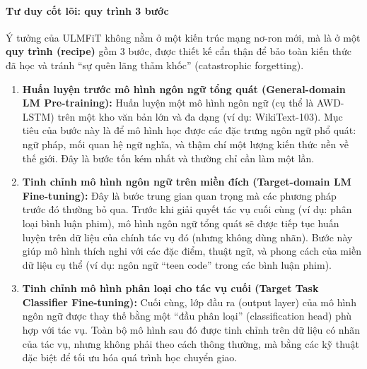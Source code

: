 \paragraph{Tư duy cốt lõi: quy trình 3 bước}
Ý tưởng của ULMFiT không nằm ở một kiến trúc mạng nơ-ron mới, mà là ở một \textbf{quy trình (recipe)} gồm 3 bước, được thiết kế cẩn thận để bảo toàn kiến thức đã học và tránh “sự quên lãng thảm khốc” (catastrophic forgetting).

\begin{enumerate}
    \item \textbf{Huấn luyện trước mô hình ngôn ngữ tổng quát (General-domain LM Pre-training):} Huấn luyện một mô hình ngôn ngữ (cụ thể là AWD-LSTM) trên một kho văn bản lớn và đa dạng (ví dụ: WikiText-103). Mục tiêu của bước này là để mô hình học được các đặc trưng ngôn ngữ phổ quát: ngữ pháp, mối quan hệ ngữ nghĩa, và thậm chí một lượng kiến thức nền về thế giới. Đây là bước tốn kém nhất và thường chỉ cần làm một lần.

    \item \textbf{Tinh chỉnh mô hình ngôn ngữ trên miền đích (Target-domain LM Fine-tuning):} Đây là bước trung gian quan trọng mà các phương pháp trước đó thường bỏ qua. Trước khi giải quyết tác vụ cuối cùng (ví dụ: phân loại bình luận phim), mô hình ngôn ngữ tổng quát sẽ được tiếp tục huấn luyện trên dữ liệu của chính tác vụ đó (nhưng không dùng nhãn). Bước này giúp mô hình thích nghi với các đặc điểm, thuật ngữ, và phong cách của miền dữ liệu cụ thể (ví dụ: ngôn ngữ “teen code” trong các bình luận phim).

    \item \textbf{Tinh chỉnh mô hình phân loại cho tác vụ cuối (Target Task Classifier Fine-tuning):} Cuối cùng, lớp đầu ra (output layer) của mô hình ngôn ngữ được thay thế bằng một “đầu phân loại” (classification head) phù hợp với tác vụ. Toàn bộ mô hình sau đó được tinh chỉnh trên dữ liệu có nhãn của tác vụ, nhưng không phải theo cách thông thường, mà bằng các kỹ thuật đặc biệt để tối ưu hóa quá trình học chuyển giao.
\end{enumerate}

\begin{center}
    \label{fig:ulmfit_process}
\end{center}

